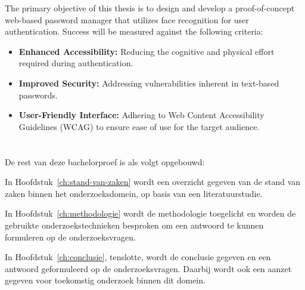 The primary objective of this thesis is to design and develop a proof-of-concept web-based password manager that utilizes face recognition for user authentication. Success will be measured against the following criteria:
\begin{itemize}
  \item \textbf{Enhanced Accessibility:} Reducing the cognitive and physical effort required during authentication.
  \item \textbf{Improved Security:} Addressing vulnerabilities inherent in text-based passwords.
  \item \textbf{User-Friendly Interface:} Adhering to Web Content Accessibility Guidelines (WCAG) to ensure ease of use for the target audience.
\end{itemize}

\section{}%
\label{sec:opzet-bachelorproef}


De rest van deze bachelorproef is als volgt opgebouwd:

In Hoofdstuk~\ref{ch:stand-van-zaken} wordt een overzicht gegeven van de stand van zaken binnen het onderzoeksdomein, op basis van een literatuurstudie.

In Hoofdstuk~\ref{ch:methodologie} wordt de methodologie toegelicht en worden de gebruikte onderzoekstechnieken besproken om een antwoord te kunnen formuleren op de onderzoeksvragen.


In Hoofdstuk~\ref{ch:conclusie}, tenslotte, wordt de conclusie gegeven en een antwoord geformuleerd op de onderzoeksvragen. Daarbij wordt ook een aanzet gegeven voor toekomstig onderzoek binnen dit domein.